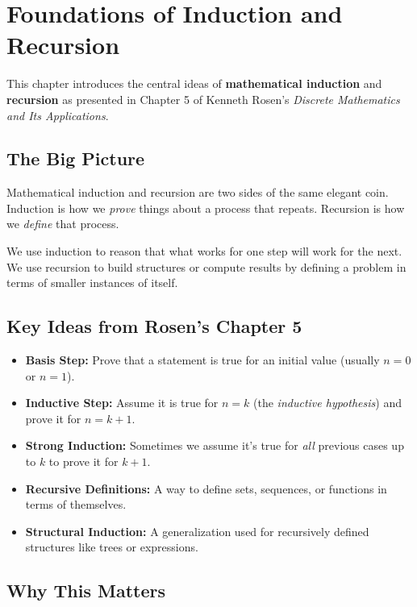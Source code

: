\chapter{Foundations of Induction and Recursion}

This chapter introduces the central ideas of \textbf{mathematical induction} and \textbf{recursion} as presented in Chapter 5 of Kenneth Rosen's \emph{Discrete Mathematics and Its Applications}.

\section{The Big Picture}

Mathematical induction and recursion are two sides of the same elegant coin. Induction is how we \emph{prove} things about a process that repeats. Recursion is how we \emph{define} that process.

We use induction to reason that what works for one step will work for the next. We use recursion to build structures or compute results by defining a problem in terms of smaller instances of itself.

\section{Key Ideas from Rosen’s Chapter 5}

\begin{itemize}
  \item \textbf{Basis Step:} Prove that a statement is true for an initial value (usually $n=0$ or $n=1$).
  \item \textbf{Inductive Step:} Assume it is true for $n=k$ (the \emph{inductive hypothesis}) and prove it for $n=k+1$.
  \item \textbf{Strong Induction:} Sometimes we assume it’s true for \emph{all} previous cases up to $k$ to prove it for $k+1$.
  \item \textbf{Recursive Definitions:} A way to define sets, sequences, or functions in terms of themselves.
  \item \textbf{Structural Induction:} A generalization used for recursively defined structures like trees or expressions.
\end{itemize}

\section{Why This Matters}

